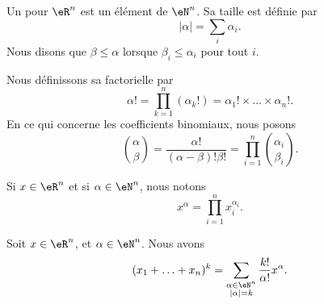 \begin{definition}		\label{DEFooCQPRooFeWeOS}
	Un  pour \( \eR^n\) est un élément de \( \eN^n\). Sa taille est définie par
	\begin{equation}
		| \alpha |=\sum_i\alpha_i.
	\end{equation}
	Nous disons que \( \beta\leq \alpha\) lorsque \( \beta_i\leq \alpha_i\) pour tout \( i\).

	Nous définissons sa factorielle par
	\begin{equation}		\label{EQooMZAMooMJuLKD}
		\alpha!=\prod_{k=1}^n(\alpha_k!)=\alpha_1!\times\ldots \times \alpha_n!.
	\end{equation}
	En ce qui concerne les coefficients binomiaux, nous posons
	\begin{equation}		\label{EQooKBURooKFBxnt}
		\binom{ \alpha }{ \beta }=\frac{ \alpha! }{ (\alpha-\beta)!\beta! }=\prod_{i=1}^n\binom{ \alpha_i }{ \beta_i }.
	\end{equation}

	Si \( x\in \eR^n\) et si \( \alpha\in \eN^n\), nous notons
	\begin{equation}
		x^{\alpha}=\prod_{i=1}^nx_i^{\alpha_i}.
	\end{equation}
\end{definition}

\begin{theorem}		\label{THOooNHAUooQvuytn}
	Soit \( x\in \eR^n\), et \( \alpha\in \eN^n\). Nous avons
	\begin{equation}
		(x_1+\ldots+x_n)^k=\sum_{\substack{ \alpha\in \eN^n \\ | \alpha |=k }  } \frac{ k! }{ \alpha! }x^{\alpha}.
	\end{equation}
\end{theorem}

